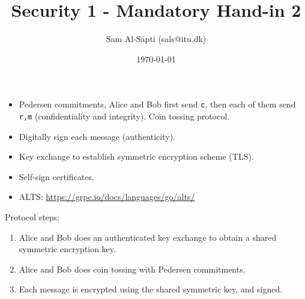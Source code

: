 \documentclass[12pt,a4paper]{article}
\title{Security 1 - Mandatory Hand-in 2}
\date{\today}
\author{Sam Al-Sapti (sals@itu.dk)}
\begin{document}
    \maketitle

    \begin{itemize}
        \item Pedersen commitments, Alice and Bob first send \texttt{c}, then
        each of them send \texttt{r,m} (confidentiality and integrity). Coin
        tossing protocol.
        \item Digitally sign each message (authenticity).
        \item Key exchange to establish symmetric encryption scheme (TLS).
        \item Self-sign certificates.
        \item ALTS: \url{https://grpc.io/docs/languages/go/alts/}
    \end{itemize}

    Protocol steps:

    \begin{enumerate}
        \item Alice and Bob does an authenticated key exchange to obtain a
        shared symmetric encryption key.
        \item Alice and Bob does coin tossing with Pedersen commitments.
        \item Each message is encrypted using the shared symmetric key, and
        signed.
    \end{enumerate}
\end{document}

